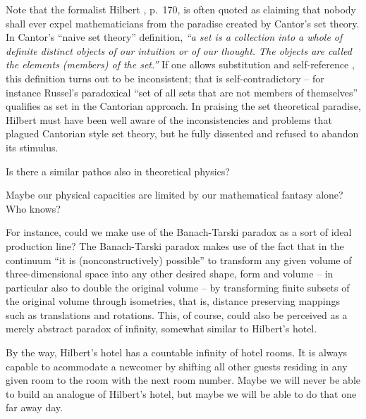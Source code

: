 Note that the formalist Hilbert \cite{hilbert-26,cantor-set}, p.~170, is often quoted as claiming that
nobody shall  ever expel mathematicians from the paradise created by Cantor's set theory.
In Cantor's ``naive set theory'' definition,
{\em ``a set is a collection into a whole of definite distinct objects of
our intuition or of our thought. The objects are called the elements
(members) of the set.''}
If one allows  substitution and self-reference \cite{smullyan-78,smullyan-92},
this definition turns out to be inconsistent; that is self-contradictory
--
for instance Russel's paradoxical ``set of all sets that are not members of themselves''
qualifies as set in the Cantorian approach.
In praising the set theoretical paradise, Hilbert must have been well aware of the inconsistencies
and problems that plagued Cantorian style set theory,
but he fully dissented and refused to abandon its stimulus.


Is there a similar pathos also in theoretical physics?

Maybe our physical capacities are limited by our mathematical fantasy alone?
Who knows?

For instance, could we make use of the Banach-Tarski paradox \cite{springerlink:10.1007/BF03023740,wagon1}
as a sort of ideal production line?
The Banach-Tarski paradox makes use of the fact that in the continuum
``it is (nonconstructively) possible'' to transform any given volume of three-dimensional space into any other desired shape, form and volume
-- in particular also to double the original volume -- by
transforming finite subsets of the original volume
through isometries, that is, distance preserving mappings such as translations and rotations.
This, of course, could also be perceived as a merely abstract paradox of infinity, somewhat similar to Hilbert's hotel.

By the way,
Hilbert's hotel \cite{rucker} has a countable infinity of hotel rooms.
It is always capable to acommodate a newcomer by shifting all other guests residing in any given room
to the room with the next room number.
Maybe we will never be able to build an analogue of Hilbert's hotel, but maybe we will
be able to do that one far away day.

